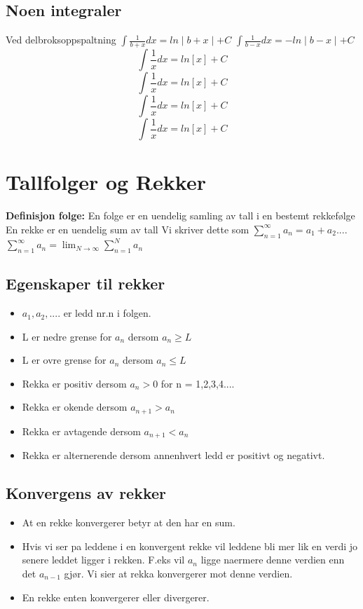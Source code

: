 \documentclass[12pt]{article}
\begin{document}
\subsection*{Noen integraler}
Ved delbroksoppspaltning
\newline$\int\frac{1}{b+x}dx=ln\mid b+x\mid+C$
\newline$\int\frac{1}{b-x}dx=-ln\mid b-x\mid+C$
\[\int\frac{1}{x}dx = ln[x]+C\]
\[\int\frac{1}{x}dx = ln[x]+C\]
\[\int\frac{1}{x}dx = ln[x]+C\]
\[\int\frac{1}{x}dx = ln[x]+C\]

\newpage\section{Tallfolger og Rekker}
{\bf Definisjon folge:}
\newline En folge er en uendelig samling av tall i en bestemt rekkefølge
\newline En rekke er en uendelig sum av tall
\newline Vi skriver dette som $\sum^{\infty}_{n=1} a_n = a_1 + a_2....$
\newline $\sum^{\infty}_{n=1}a_n = \lim_{N\to\infty}\sum^{N}_{n=1}a_n$
\subsection*{Egenskaper til rekker}
\begin{itemize}
\item $a_1,a_2,....$ er ledd nr.n i folgen.
\item L er nedre grense for $a_n$ dersom $a_n \geq L$
\item L er ovre grense for $a_n$ dersom $a_n \leq L$
\item Rekka er positiv dersom $a_n > 0$ for n = 1,2,3,4....
\item Rekka er okende dersom $a_{n+1} > a_n$
\item Rekka er avtagende dersom $a_{n+1} < a_n$
\item Rekka er alternerende dersom annenhvert ledd er positivt og negativt.
\end{itemize}
\subsection*{Konvergens av rekker}
\begin{itemize}
\item At en rekke konvergerer betyr at den har en sum.
\item Hvis vi ser pa leddene i en konvergent
rekke vil leddene bli mer lik en verdi jo senere leddet ligger i rekken.
\newline F.eks vil $a_{n}$ ligge naermere denne verdien enn det $a_{n-1}$ gjør.
\newline Vi sier at rekka konvergerer mot denne verdien.
\item En rekke enten konvergerer eller divergerer.
\end{itemize}
\end{document}
